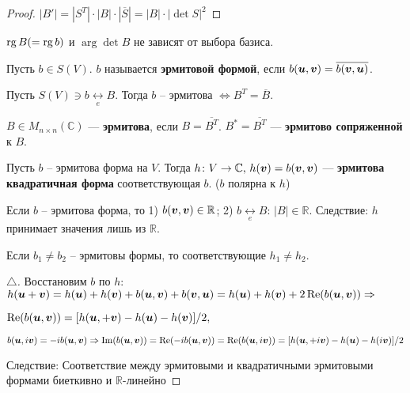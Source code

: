 \begin{proof}
	$|B'| = |S^T| \cdot |B| \cdot |\overline{S}| = |B| \cdot |\det S|^2$
\end{proof}

\begin{to_con}
	$\mathop{\mathrm{rg}}\nolimits B(=\mathop{\mathrm{rg}}\nolimits b)$ и $\arg \det B$ не зависят от выбора базиса. 
\end{to_con}

\begin{to_def} 
	Пусть $b \in S(V)$. $b$ называется \textbf{эрмитовой формой}, если $b(\mbox{\boldmath $u$},\mbox{\boldmath $v$}) = \overline{b(\mbox{\boldmath $v$},\mbox{\boldmath $u$})}$.   
\end{to_def}

\begin{to_lem}
	Пусть $S(V) \ni b \underset{e}{\longleftrightarrow} B$. Тогда $b$ -- эрмитова $\Longleftrightarrow B^T = \overline{B}$.
\end{to_lem}

\begin{to_def} 
	$B \in M_{n \times n}(\mathbb{C})$ --- \textbf{эрмитова}, если $B = \overline{B^T}$. $B^* = \overline{B^T}$ --- \textbf{эрмитово сопряженной } к $B$.
\end{to_def}

\begin{to_def}
	Пусть $b$ -- эрмитова форма на $V$. Тогда $h \colon V \to \mathbb{C}, \, h(\mbox{\boldmath $v$}) = b(\mbox{\boldmath $v$},\mbox{\boldmath $v$})$ --- \textbf{эрмитова квадратичная форма} соответствующая $b$. ($b$ полярна к $h$)
\end{to_def}
	
\begin{to_lem}
	Если $b$ -- эрмитова форма, то 1) $b (\mbox{\boldmath $v$},\mbox{\boldmath $v$}) \in \mathbb{R}$; 2) $b \underset{e}{\longleftrightarrow} B:\, |B| \in \mathbb{R}$.	Следствие: $h$ принимает значения лишь из $\mathbb{R}$.
\end{to_lem}

\begin{to_lem}
	Если $b_1 \neq b_2$ -- эрмитовы формы, то соответствующие $h_1 \neq h_2$.
\end{to_lem}

\begin{proof}[$\triangle$]
	Восстановим $b$ по $h$: $h(\mbox{\boldmath $u$} + \mbox{\boldmath $v$}) = h(\mbox{\boldmath $u$}) + h(\mbox{\boldmath $v$}) + b(\mbox{\boldmath $u$}, \mbox{\boldmath $v$}) + b(\mbox{\boldmath $v$}, \mbox{\boldmath $u$}) = h(\mbox{\boldmath $u$}) + h(\mbox{\boldmath $v$}) + 2\mathop{\mathrm{Re}}\nolimits (b(\mbox{\boldmath $u$},\mbox{\boldmath $v$})) \Rightarrow$

	$\mathop{\mathrm{Re}}\nolimits(b(\mbox{\boldmath $u$}, \mbox{\boldmath $v$})) = [h(\mbox{\boldmath $u$}, + \mbox{\boldmath $v$}) - h(\mbox{\boldmath $u$}) - h(\mbox{\boldmath $v$})]/2,$

	$b(\mbox{\boldmath $u$},i \mbox{\boldmath $v$}) = - i b(\mbox{\boldmath $u$}, \mbox{\boldmath $v$}) \Rightarrow\mathop{\mathrm{Im}}\nolimits (b(\mbox{\boldmath $u$},\mbox{\boldmath $v$})) = \mathop{\mathrm{Re}}\nolimits (-i b(\mbox{\boldmath $u$},\mbox{\boldmath $v$})) = \mathop{\mathrm{Re}}\nolimits (b(\mbox{\boldmath $u$}, i \mbox{\boldmath $v$})) = [h(\mbox{\boldmath $u$}, + i \mbox{\boldmath $v$}) - h(\mbox{\boldmath $u$}) - h(i \mbox{\boldmath $v$})]/2$

	Следствие: Соответствие между эрмитовыми и квадратичными эрмитовыми формами биеткивно и $\mathbb{R}$-линейно 
\end{proof}

